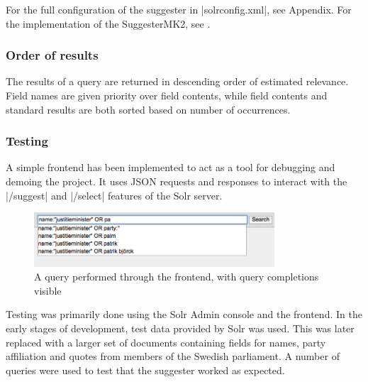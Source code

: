 For the full configuration of the suggester in |solrconfig.xml|, see Appendix.
For the implementation of the SuggesterMK2, see \cite{GITHUBPROJ}.

\subsubsection{Order of results}

The results of a query are returned in descending order of estimated relevance. Field names are given priority over field contents, while field contents and standard results are both sorted based on number of occurrences.

\subsubsection{Testing}

A simple frontend has been implemented to act as a tool for debugging and demoing the project. It uses JSON requests and responses to interact with the |/suggest| and |/select| features of the Solr server.

\begin{figure}[h!]
    \centering
    \includegraphics[width=0.8\textwidth]{img/frontend.png}
    \caption{\footnotesize{A query performed through the frontend, with query completions visible}}
    \label{fig:frontend}
\end{figure}

Testing was primarily done using the Solr Admin console and the frontend.
In the early stages of development, test data provided by Solr was used. This was later replaced with a larger set of documents containing fields for names, party affiliation and quotes from members of the Swedish parliament. A number of queries were used to test that the suggester worked as expected.
